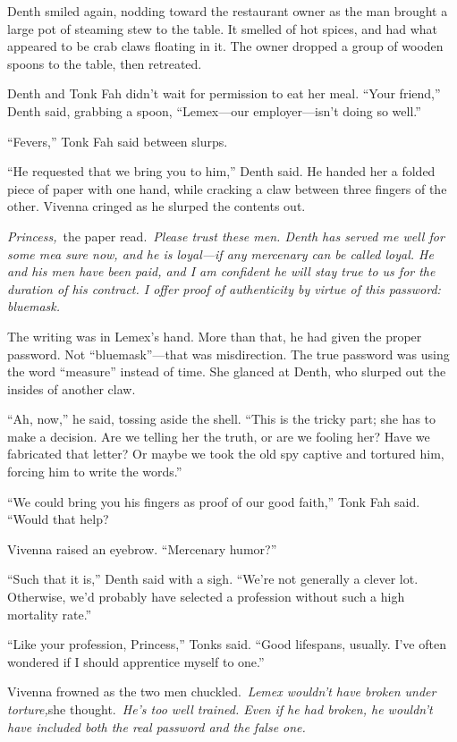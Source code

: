 Denth smiled again, nodding toward the restaurant owner as the man brought a large pot of steaming stew to the table. It smelled of hot spices, and had what appeared to be crab claws floating in it. The owner dropped a group of wooden spoons to the table, then retreated.

Denth and Tonk Fah didn’t wait for permission to eat her meal. “Your friend,” Denth said, grabbing a spoon, “Lemex—our employer—isn’t doing so well.”

“Fevers,” Tonk Fah said between slurps.

“He requested that we bring you to him,” Denth said. He handed her a folded piece of paper with one hand, while cracking a claw between three fingers of the other. Vivenna cringed as he slurped the contents out.

\textit{Princess,}~the paper read.~\textit{Please trust these men. Denth has served me well for some mea sure now, and he is loyal—if any mercenary can be called loyal. He and his men have been paid, and I am confident he will stay true to us for the duration of his contract. I offer proof of authenticity by virtue of this password: bluemask.}

The writing was in Lemex’s hand. More than that, he had given the proper password. Not “bluemask”—that was misdirection. The true password was using the word “measure” instead of time. She glanced at Denth, who slurped out the insides of another claw.

“Ah, now,” he said, tossing aside the shell. “This is the tricky part; she has to make a decision. Are we telling her the truth, or are we fooling her? Have we fabricated that letter? Or maybe we took the old spy captive and tortured him, forcing him to write the words.”

“We could bring you his fingers as proof of our good faith,” Tonk Fah said. “Would that help?

Vivenna raised an eyebrow. “Mercenary humor?”

“Such that it is,” Denth said with a sigh. “We’re not generally a clever lot. Otherwise, we’d probably have selected a profession without such a high mortality rate.”

“Like your profession, Princess,” Tonks said. “Good lifespans, usually. I’ve often wondered if I should apprentice myself to one.”

Vivenna frowned as the two men chuckled.~\textit{Lemex wouldn’t have broken under torture,}she thought.~\textit{He’s too well trained. Even if he had broken, he wouldn’t have included both the real password and the false one.}

